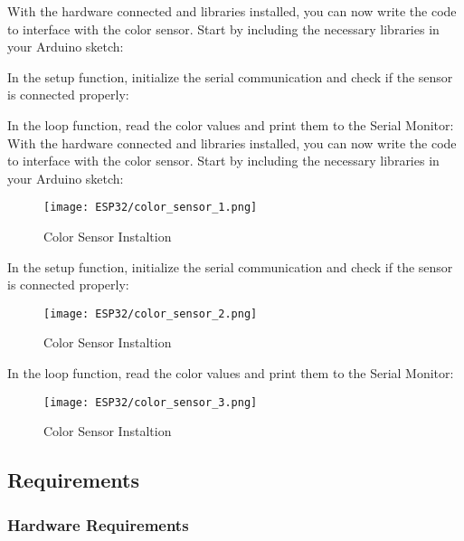 With the hardware connected and libraries installed, you can now write the code to interface with the color sensor. Start by including the necessary libraries in your Arduino sketch:

In the setup function, initialize the serial communication and check if the sensor is connected properly:

In the loop function, read the color values and print them to the Serial Monitor:
\\

With the hardware connected and libraries installed, you can now write the code to interface with the color sensor. Start by including the necessary libraries in your Arduino sketch:
\begin{figure}  
	\begin{center}
		\texttt{[image: ESP32/color\_sensor\_1.png]}
		\caption{Color Sensor  Instaltion} 
		\label{fig:Python 3.10.}
	\end{center}
\end{figure}	


In the setup function, initialize the serial communication and check if the sensor is connected properly:

\begin{figure}  
	\begin{center}
		\texttt{[image: ESP32/color\_sensor\_2.png]}
		\caption{Color Sensor Instaltion} 
		\label{fig:Python 3.10.}
	\end{center}
\end{figure}	

In the loop function, read the color values and print them to the Serial Monitor:
\begin{figure}  
	\begin{center}
		\texttt{[image: ESP32/color\_sensor\_3.png]}
		\caption{Color Sensor Instaltion} 
		\label{fig:Python 3.10.}
	\end{center}
\end{figure}	



\subsection*{Requirements}



\subsubsection*{Hardware Requirements}


